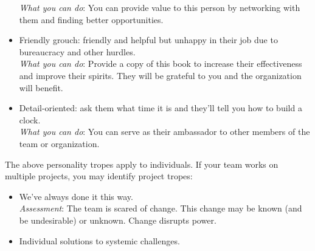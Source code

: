 \begin{itemize}
    \textit{What you can do}: You can provide value to this person by networking with them and finding better opportunities.
    \item Friendly grouch: friendly and helpful but unhappy in their job due to bureaucracy and other hurdles. \\
    \textit{What you can do}: Provide a copy of this book to increase their effectiveness and improve their spirits. They will be grateful to you and the organization will benefit.
    \item Detail-oriented: ask them what time it is and they'll tell you how to build a clock. \\
    \textit{What you can do}: You can serve as their ambassador to other members of the team or organization.  
\end{itemize}


The above personality tropes apply to individuals. If your team works on multiple projects, you may identify project tropes:
\begin{itemize}
    \item We've always done it this way.\\
    \textit{Assessment}: The team is scared of change. This change may be known (and be undesirable) or unknown. Change disrupts power.
    \item Individual solutions to systemic challenges.
\end{itemize}
